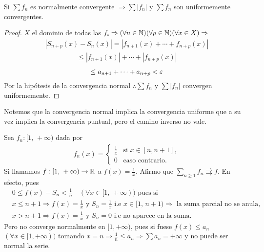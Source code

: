 \clearpage

\begin{theorem}
  Si $\sum f_n$ es normalmente convergente $\Rightarrow \sum |f_n|$ y $\sum f_n$ son uniformemente convergentes.
  \begin{proof}
    $X$ el dominio de todas las $f_i \Rightarrow (\forall n \in \mathbb{N})(\forall p \in \mathbb{N})(\forall x \in X) \Rightarrow$ \begin{align*}
      |S_{n + p}(x) - S_n(x)| = |f_{n+1}(x) + \cdots + f_{n + p}(x)|
    \end{align*}
    \begin{align*}
      \leq |f_{n+1}(x)| + \cdots + |f_{n+p}(x)|
    \end{align*}
    \begin{align*}
      \leq a_{n+1} + \cdots + a_{n+p} < \varepsilon
    \end{align*}
    Por la hipótesis de la convergencia normal $\therefore \sum f_n$ y $\sum |f_n|$ convergen uniformemente.
  \end{proof}
\end{theorem}

Notemos que la convergencia normal implica la convergencia uniforme que a su vez implica la convergencia puntual, pero el camino inverso no vale.

\begin{eg}
  Sea $f_n : [1\text{, }+\infty)$ dada por \begin{align*}
    f_n(x) = \begin{cases}
               \frac{1}{x} & \text{si } x \in [n, n+1], \\
               0           & \text{caso contrario.}
             \end{cases}
  \end{align*}
  Si llamamos $f: [1\text{, } +\infty) \to \mathbb{R}$ a $f(x) = \frac{1}{x}$.
  Afirmo que $\sum_{n \geq 1} f_n \rightrightarrows f$. En efecto, pues
  \begin{align*}
     & 0 \leq f(x) - S_n < \frac{1}{n} \quad (\forall x \in [1\text{, } +\infty)) \text{ pues si }                                                                  \\
     & x \leq n+1 \Rightarrow f(x) = \frac{1}{x} \text{ y } S_n = \frac{1}{x} \text{ i.e } x \in [1\text{, } n+1) \Rightarrow \text{ la suma parcial no se anula, } \\
     & x > n+1 \Rightarrow f(x) = \frac{1}{x} \text{ y } S_n = 0 \text{ i.e no aparece en la suma.}
  \end{align*}
  Pero no converge normalmente en $[1, +\infty)$, pues si fuese $f(x) \leq a_n$ $(\forall x \in [1, +\infty))$ tomando $x = n \Rightarrow \frac{1}{n} \leq a_n \Rightarrow \sum a_n = +\infty$ y no puede ser normal la serie.
\end{eg}

